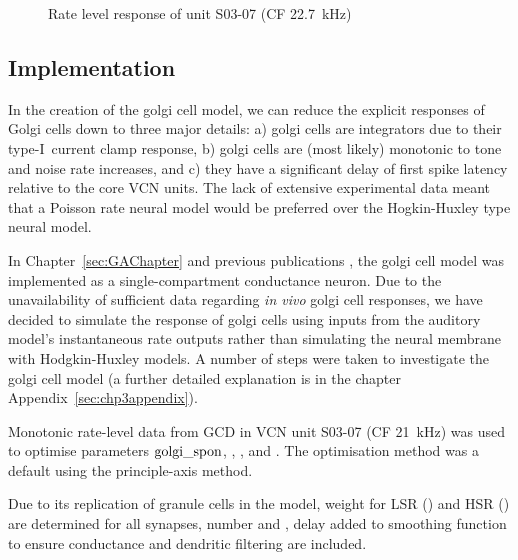 \begin{figure}[htb]
  \centering
\caption{Rate level response of unit S03-07 (CF 22.7~kHz) 
  \citep[from~Fig.~2]{GhoshalKim:1997} }\label{fig:GolgiKimFig2}
\end{figure}


\clearpage
\subsection{Implementation}

In the creation of the golgi cell model, we can reduce the explicit
responses of Golgi cells down to three major details: a) golgi cells are integrators due to their type-I~current clamp response, b) golgi cells are (most likely) monotonic to tone and noise rate increases, and
c) they have a significant delay of first spike latency relative to the core VCN units. The lack of extensive experimental data meant that a Poisson rate neural model
would be preferred over the Hogkin-Huxley type neural model. 

\medskip{}

In Chapter~\ref{sec:GAChapter} and previous publications \citep{EagerGraydenEtAl:2006a}, the golgi cell model was implemented as a single-compartment conductance  neuron. Due to the unavailability of sufficient data regarding \emph{in vivo}
golgi cell responses, we have decided to simulate the response of
golgi cells using inputs from the auditory model's instantaneous rate outputs rather
than simulating the neural membrane with Hodgkin-Huxley models.  A number of steps
were taken to investigate the golgi cell model (a further detailed explanation is in the chapter Appendix~\ref{sec:chp3appendix}).

\medskip{}

Monotonic rate-level data from GCD in VCN \citep{GhoshalKim:1996} unit
S03-07 (CF 21~kHz) was used to optimise parameters ${\rm
golgi\_spon}$, \wLSRGLG, \wHSRGLG, and \sANFGLG\@.  The optimisation
method was a default using the principle-axis method.

\medskip{}

Due to its replication of granule cells in the model, weight for LSR (\wLSRGLG) and HSR (\wHSRGLG) are determined for all synapses, number \nLSRDS and \nHSRDS, delay \dANFGLG added to smoothing function to ensure conductance and dendritic filtering are included.


